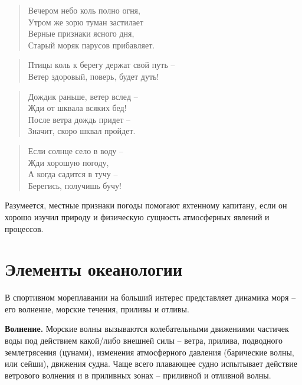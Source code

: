 \documentclass[a4paper, 12pt, twoside, final, book, russian, fittopage, cyremdash]{ncc}
\begin{document}
\begin{quote}
Вечером небо коль полно огня, \\
Утром же зорю туман застилает \\
Верные признаки ясного дня, \\
Старый моряк парусов прибавляет.
\end{quote}

\begin{quote}
Птицы коль к берегу держат свой путь \--- \\
Ветер здоровый, поверь, будет дуть!
\end{quote}

\begin{quote}
Дождик раньше, ветер вслед \--- \\
Жди от шквала всяких бед! \\
После ветра дождь придет \--- \\
Значит, скоро шквал пройдет.
\end{quote}

\begin{quote}
Если солнце село в воду \--- \\
Жди хорошую погоду, \\
А когда садится в тучу \--- \\
Берегись, получишь бучу!
\end{quote}

Разумеется, местные признаки погоды помогают яхтенному капитану, если он хорошо изучил природу и физическую сущность атмосферных явлений и процессов.

\section{Элементы океанологии}

В спортивном мореплавании на больший интерес представляет динамика моря \--- его волнение, морские течения, приливы и отливы.

\textbf{Волнение.} Морские волны вызываются колебательными движениями частичек воды под действием какой\-/либо внешней силы \--- ветра, прилива, подводного землетрясения (цунами), изменения атмосферного давления (барические волны, или сейши), движения судна. Чаще всего плавающее судно испытывает действие ветрового волнения и в приливных зонах \--- приливной и отливной волны.
\end{document}
